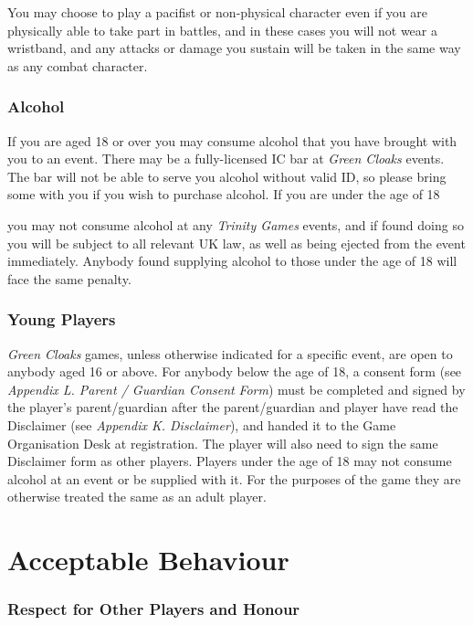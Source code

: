 You may choose to play a pacifist or non-physical character even if you are physically able to take part in battles, and in these cases you will not wear a wristband, and any attacks or damage you sustain will be taken in the same way as any combat character.

\subsection{Alcohol}

If you are aged 18 or over you may consume alcohol that you have brought with you to an event. There may be a fully-licensed IC bar at \textit{Green Cloaks} events. The bar will not be able to serve you alcohol without valid ID, so please bring some with you if you wish to purchase alcohol. If you are under the age of 18

you may not consume alcohol at any \textit{Trinity Games} events, and if found doing so you will be subject to all relevant UK law, as well as being ejected from the event immediately. Anybody found supplying alcohol to those under the age of 18 will face the same penalty.

\subsection{Young Players}

\textit{Green Cloaks} games, unless otherwise indicated for a specific event, are open to anybody aged 16 or above. For anybody below the age of 18, a consent form (see \textit{Appendix L. Parent / Guardian Consent} \textit{Form}) must be completed and signed by the player's parent/guardian after the parent/guardian and player have read the Disclaimer (see \textit{Appendix K. Disclaimer}), and handed it to the Game Organisation Desk at registration. The player will also need to sign the same Disclaimer form as other players. Players under the age of 18 may not consume alcohol at an event or be supplied with it. For the purposes of the game they are otherwise treated the same as an adult player.

\chapter{Acceptable Behaviour}

\subsection{Respect for Other Players and Honour}

